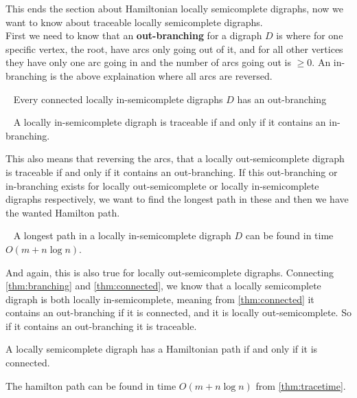 This ends the section about Hamiltonian locally semicomplete digraphs, now we want to know about traceable locally semicomplete digraphs. \\
First we need to know that an \textbf{out-branching} for a digraph $D$ is where for one specific vertex, the root, have arcs only going out of it, and for all other vertices they have only one arc going in and the number of arcs going out is $\geq 0$. 
An in-branching is the above explaination where all arcs are reversed.
\begin{lemma}~\cite{banggutin}
    Every connected locally in-semicomplete digraphs $D$ has an out-branching
    \label{thm:connected}
\end{lemma}
\begin{thm}~\cite{bangJCT59}
    A locally in-semicomplete digraph is traceable if and only if it contains an in-branching.
    \label{thm:branching}
\end{thm}
This also means that reversing the arcs, that a locally out-semicomplete digraph is traceable if and only if it contains an out-branching. 
If this out-branching or in-branching exists for locally out-semicomplete or locally in-semicomplete digraphs respectively, we want to find the longest path in these and then we have the wanted Hamilton path.
\begin{thm}~\cite{bangDM41}
    A longest path in a locally in-semicomplete digraph $D$ can be found in time $O(m+n\log n)$. 
    \label{thm:tracetime}
\end{thm}
And again, this is also true for locally out-semicomplete digraphs.
Connecting \autoref{thm:branching} and \autoref{thm:connected}, we know that a locally semicomplete digraph is both locally in-semicomplete, meaning from \autoref{thm:connected} it contains an out-branching if it is connected, and it is locally out-semicomplete. So if it contains an out-branching it is traceable. 
\begin{thm}%
    A locally semicomplete digraph has a Hamiltonian path if and only if it is connected.
\end{thm}
The hamilton path can be found in time $O(m+n\log n)$ from \autoref{thm:tracetime}.


